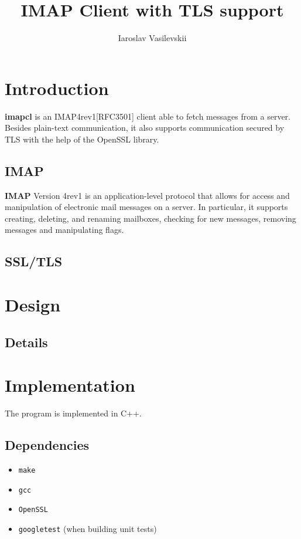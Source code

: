\documentclass[a4]{report}
\title{IMAP Client with TLS support}
\author{Iaroslav Vasilevskii}
\begin{document}
\maketitle
\tableofcontents

\chapter{Introduction}

\textbf{imapcl} is an IMAP4rev1[RFC3501] client able to fetch messages from a server. Besides plain-text communication, it also supports communication secured by TLS with the help of the OpenSSL library.

\section{IMAP}

\textbf{IMAP} Version 4rev1 is an application-level protocol that allows for access and manipulation of electronic mail messages on a server. In particular, it supports creating, deleting, and renaming mailboxes, checking for new messages, removing messages and manipulating flags.

\section{SSL/TLS}

\chapter{Design}

\section{Details}

\chapter{Implementation}

The program is implemented in C++.

\section{Dependencies}

\begin{itemize}
\item \texttt{make}
\item \texttt{gcc}
\item \texttt{OpenSSL}
\item \texttt{googletest} (when building unit tests)
\end{itemize}
\end{document}

